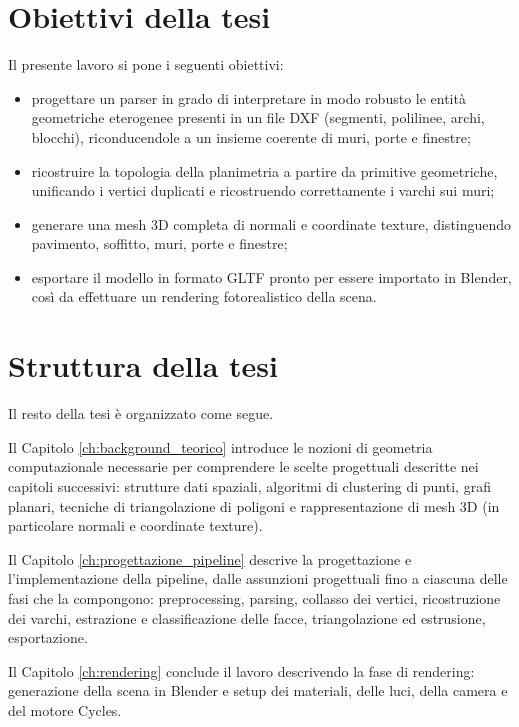 \section{Obiettivi della tesi}
\label{sec:obiettivi_e_struttura_tesi}

Il presente lavoro si pone i seguenti obiettivi: 

\begin{itemize}
	\item progettare un parser in grado di interpretare in modo robusto le entità geometriche eterogenee presenti in un file DXF (segmenti, polilinee, archi, blocchi), riconducendole a un insieme coerente di muri, porte e finestre;
	\item ricostruire la topologia della planimetria a partire da primitive geometriche, unificando i vertici duplicati e ricostruendo correttamente i varchi sui muri;
	\item generare una mesh 3D completa di normali e coordinate texture, distinguendo pavimento, soffitto, muri, porte e finestre;
	\item esportare il modello in formato GLTF pronto per essere importato in Blender, così da effettuare un rendering fotorealistico della scena.
\end{itemize}


\section{Struttura della tesi}
\label{sec:struttura_della_tesi}

Il resto della tesi è organizzato come segue.

Il Capitolo \ref{ch:background_teorico} introduce le nozioni di geometria computazionale necessarie per comprendere le scelte progettuali descritte nei capitoli successivi: strutture dati spaziali, algoritmi di clustering di punti, grafi planari, tecniche di triangolazione di poligoni e rappresentazione di mesh 3D (in particolare normali e coordinate texture).

Il Capitolo \ref{ch:progettazione_pipeline} descrive la progettazione e l'implementazione della pipeline, dalle assunzioni progettuali fino a ciascuna delle fasi che la compongono: preprocessing, parsing, collasso dei vertici, ricostruzione dei varchi, estrazione e classificazione delle facce, triangolazione ed estrusione, esportazione.

Il Capitolo \ref{ch:rendering} conclude il lavoro descrivendo la fase di rendering: generazione della scena in Blender e setup dei materiali, delle luci, della camera e del motore Cycles.